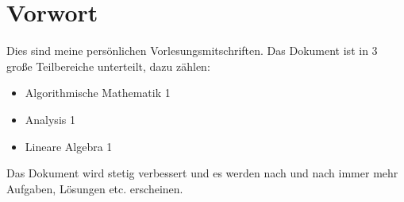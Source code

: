 \chapter*{Vorwort}
Dies sind meine persönlichen Vorlesungsmitschriften. Das Dokument ist in 3 große Teilbereiche unterteilt, dazu zählen:
\begin{itemize}
	\item Algorithmische Mathematik 1
	\item Analysis 1
	\item Lineare Algebra 1
\end{itemize}

Das Dokument wird stetig verbessert und es werden nach und nach immer mehr Aufgaben, Lösungen etc. erscheinen. 









